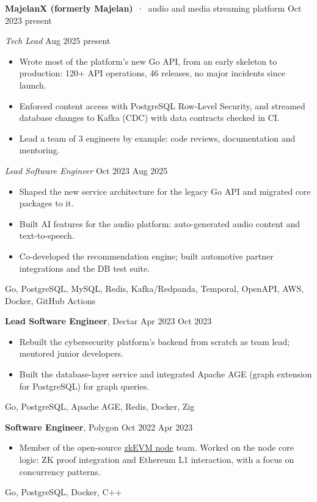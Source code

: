 \documentclass[a4paper,10pt]{article}
\newcommand{\dates}[1]{{\small\ttfamily #1}}
\newcommand{\job}[3]{\textbf{#1}, #2 \hfill \dates{#3}\par\nopagebreak}
\newcommand{\company}[3]{\textbf{#1} \,·\, {\small #2} \hfill \dates{#3}\par\nopagebreak}
\newcommand{\role}[2]{\textit{#1} \hfill \dates{#2}\par\nopagebreak}
\newcommand{\stack}[1]{{\small\ttfamily\color{darkgray}#1}\par\vspace{3pt}}
\begin{document}
\company{MajelanX (formerly Majelan)}{audio and media streaming platform}{Oct 2023 \textendash{} present}
\role{Tech Lead}{Aug 2025 \textendash{} present}
\begin{itemize}
  \item Wrote most of the platform's new Go API, from an early skeleton to production:
        120+ API operations, 46 releases, no major incidents since launch.
  \item Enforced content access with PostgreSQL Row-Level Security, and streamed database changes
        to Kafka (CDC) with data contracts checked in CI.
  \item Lead a team of 3 engineers by example: code reviews, documentation and mentoring.
\end{itemize}
\role{Lead Software Engineer}{Oct 2023 \textendash{} Aug 2025}
\begin{itemize}
  \item Shaped the new service architecture for the legacy Go API and migrated core packages to it.
  \item Built AI features for the audio platform: auto-generated audio content and text-to-speech.
  \item Co-developed the recommendation engine; built automotive partner integrations and the DB test suite.
\end{itemize}
\stack{Go, PostgreSQL, MySQL, Redis, Kafka/Redpanda, Temporal, OpenAPI, AWS, Docker, GitHub Actions}

\job{Lead Software Engineer}{Dectar}{Apr 2023 \textendash{} Oct 2023}
\begin{itemize}
  \item Rebuilt the cybersecurity platform's backend from scratch as team lead; mentored junior developers.
  \item Built the database-layer service and integrated Apache AGE (graph extension for PostgreSQL) for graph queries.
\end{itemize}
\stack{Go, PostgreSQL, Apache AGE, Redis, Docker, Zig}

\job{Software Engineer}{Polygon}{Oct 2022 \textendash{} Apr 2023}
\begin{itemize}
  \item Member of the open-source \href{https://github.com/0xPolygonHermez/zkevm-node}{zkEVM node} team. Worked on the node
        core logic: ZK proof integration and Ethereum L1 interaction, with a focus on concurrency patterns.
\end{itemize}
\stack{Go, PostgreSQL, Docker, C++}
\end{document}
